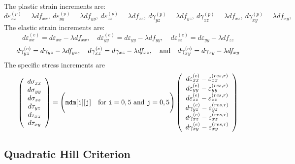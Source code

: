 \documentclass[11pt]{article}
\def\code#1{{\small\tt #1}}
\def\err#1{\varepsilon_{#1}^{(res,r)}}
\def\g#1{\gamma_{#1}}
\def\s#1{\sigma_{#1}}
\def\t#1{\tau_{#1}}
\def\fvvec#1#2#3#4#5#6{\left(\begin{array}{ccc} #1 \\ #2 \\ #3 \\ #4 \\ #5 \\ #6 \end{array}\right)}
\begin{document}
 The plastic strain increments are:
\begin{equation}
       d\varepsilon_{xx}^{(p)} = \lambda df_{xx}, \ 
       d\varepsilon_{yy}^{(p)} = \lambda df_{yy}, \ 
       d\varepsilon_{zz}^{(p)} = \lambda df_{zz}, \ 
       d\gamma_{yz}^{(p)} =  \lambda df_{yz}, \ 
       d\gamma_{xz}^{(p)} =  \lambda df_{xz}, \ 
       d\gamma_{xy}^{(p)} =  \lambda df_{xy},
\end{equation}
The elastic strain increments are:
\begin{equation}
       d\varepsilon_{xx}^{(e)} = d\varepsilon_{xx} -\lambda df_{xx}, \quad
       d\varepsilon_{yy}^{(e)} = d\varepsilon_{yy} -\lambda df_{yy}, \quad
       d\varepsilon_{zz}^{(e)} =  d\varepsilon_{yy} -\lambda df_{zz}
\end{equation}
\begin{equation}
       d\gamma_{yz}^{(e)} = d\gamma_{yz} -  \lambda df_{yz}, \quad 
       d\gamma_{xz}^{(e)} = d\gamma_{xz} -  \lambda df_{xz}, \quad  {\rm and} \quad
       d\gamma_{xy}^{(e)} = d\gamma_{xy} -  \lambda df_{xy}
\end{equation}
The specific stress increments are
\begin{equation}
      \fvvec{d\s{xx}}{d\s{yy}}{d\s{zz}}{d\t{yz}}{d\t{xz}}{d\t{xy}} = \Biggl(\code{mdm[i][j]} \quad {\rm for\ }\code{i}=0,5\ {\rm and\ }\code{j}=0,5\Biggr)
          \fvvec{d\varepsilon_{xx}^{(e)}  - \err{xx}}{d\varepsilon_{yy}^{(e)}  -\err{yy}}{d\varepsilon_{zz}^{(e)}  -\err{zz}}
                             {d\g{yz}^{(e)}-\err{yz}}{d\g{xz}^{(e)}-\err{xz}}{d\g{xy}^{(e)}-\err{xy}}
 \end{equation}

\subsection{Quadratic Hill Criterion}
\end{document}
